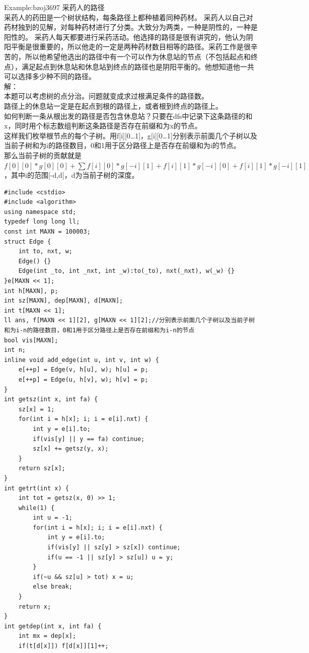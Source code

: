 \documentclass[10pt]{ctexart}
\begin{document}
{Example:bzoj3697 采药人的路径\\
采药人的药田是一个树状结构，每条路径上都种植着同种药材。
采药人以自己对药材独到的见解，对每种药材进行了分类。大致分为两类，一种是阴性的，一种是阳性的。
采药人每天都要进行采药活动。他选择的路径是很有讲究的，他认为阴阳平衡是很重要的，所以他走的一定是两种药材数目相等的路径。采药工作是很辛苦的，所以他希望他选出的路径中有一个可以作为休息站的节点（不包括起点和终点），满足起点到休息站和休息站到终点的路径也是阴阳平衡的。他想知道他一共可以选择多少种不同的路径。\\
解：\\
本题可以考虑树的点分治。问题就变成求过根满足条件的路径数。\\
路径上的休息站一定是在起点到根的路径上，或者根到终点的路径上。\\
如何判断一条从根出发的路径是否包含休息站？只要在dfs中记录下这条路径的和x，同时用个标志数组判断这条路径是否存在前缀和为x的节点。\\
这样我们枚举根节点的每个子树。用f[i][0…1]，g[i][0…1]分别表示前面几个子树以及当前子树和为i的路径数目，0和1用于区分路径上是否存在前缀和为i的节点。\\
那么当前子树的贡献就是$f[0][0] * g[0][0] + \sum f [i][0] * g [-i][1] + f[i][1] * g[-i][0] + f[i][1] * g[-i][1]$，其中i的范围[-d,d]，d为当前子树的深度。
\begin{lstlisting}
#include <cstdio>
#include <algorithm>
using namespace std;
typedef long long ll;
const int MAXN = 100003;
struct Edge {
    int to, nxt, w;
    Edge() {}
    Edge(int _to, int _nxt, int _w):to(_to), nxt(_nxt), w(_w) {}
}e[MAXN << 1];
int h[MAXN], p;
int sz[MAXN], dep[MAXN], d[MAXN];
int t[MAXN << 1];
ll ans, f[MAXN << 1][2], g[MAXN << 1][2];//分别表示前面几个子树以及当前子树和为i-n的路径数目，0和1用于区分路径上是否存在前缀和为i-n的节点
bool vis[MAXN];
int n;
inline void add_edge(int u, int v, int w) {
    e[++p] = Edge(v, h[u], w); h[u] = p;
    e[++p] = Edge(u, h[v], w); h[v] = p;
}
int getsz(int x, int fa) {
    sz[x] = 1;
    for(int i = h[x]; i; i = e[i].nxt) {
        int y = e[i].to;
        if(vis[y] || y == fa) continue;
        sz[x] += getsz(y, x);
    }
    return sz[x];
}
int getrt(int x) {
    int tot = getsz(x, 0) >> 1;
    while(1) {
        int u = -1;
        for(int i = h[x]; i; i = e[i].nxt) {
            int y = e[i].to;
            if(vis[y] || sz[y] > sz[x]) continue;
            if(u == -1 || sz[y] > sz[u]) u = y;
        }
        if(~u && sz[u] > tot) x = u;
        else break;
    }
    return x;
}
int getdep(int x, int fa) {
    int mx = dep[x];
    if(t[d[x]]) f[d[x]][1]++;

\end{lstlisting}}
\end{document}
